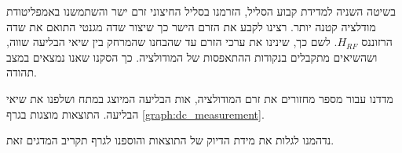 \documentclass{article}
\begin{document}
בשיטה השניה למדידת קבוע הסליל,  הזרמנו בסליל החיצוני זרם ישר והשתמשנו באמפליטודת מודלציה קטנה יותר.
רצינו לקבע את הזרם הישר כך שיצור שדה מגנטי התואם את שדה הרזוננס
$H_{RF}$.
לשם כך, שינינו את ערכי הזרם עד שהבחנו שהמרחק בין שיאי הבליעה שווה, ושהשיאים מתקבלים בנקודות ההתאפסות של המודולציה.
כך הסקנו שאנו נמצאים במצב תהודה.

מדדנו עבור מספר מחזורים את זרם המודולציה,
אות הבליעה המיוצג במתח ושלפנו את שיאי הבליעה. התוצאות מוצגות בגרף
\ref{graph:dc_measurement}.

\begin{graph}[H]
	\begin{center}
	\resizebox{\textwidth}{!}{}
	\end{center}
	\caption{
	המתח על הסליל החיצוני כתלות בזמן, בזמן בליעה, עבור זרם ישר המוזרם בסליל החיצוני
	}
\label{graph:dc_measurement}
\end{graph}

נדהמנו לגלות את מידת הדיוק של התוצאות והוספנו לגרף תקריב המדגים זאת.





\end{document}
